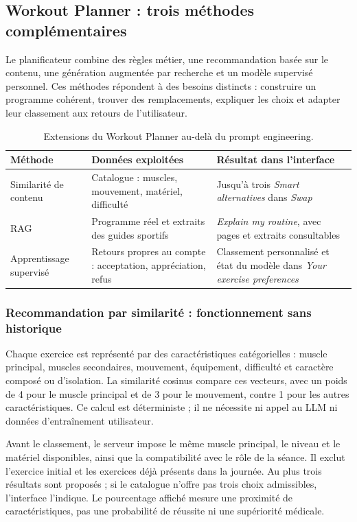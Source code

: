\documentclass[11pt,a4paper]{article}
\begin{document}
\subsection{Workout Planner : trois méthodes complémentaires}
\label{sec:planner-ai}
Le planificateur combine des règles métier, une recommandation basée sur le contenu, une génération augmentée par recherche et un modèle supervisé personnel. Ces méthodes répondent à des besoins distincts : construire un programme cohérent, trouver des remplacements, expliquer les choix et adapter leur classement aux retours de l'utilisateur.
\begin{table}[H]
\small\begin{tabularx}{\linewidth}{p{3cm}XX}
\toprule
\textbf{Méthode} & \textbf{Données exploitées} & \textbf{Résultat dans l'interface} \\
\midrule
Similarité de contenu & Catalogue : muscles, mouvement, matériel, difficulté & Jusqu'à trois \textit{Smart alternatives} dans \textit{Swap} \\
RAG & Programme réel et extraits des guides sportifs & \textit{Explain my routine}, avec pages et extraits consultables \\
Apprentissage supervisé & Retours propres au compte : acceptation, appréciation, refus & Classement personnalisé et état du modèle dans \textit{Your exercise preferences} \\
\bottomrule
\end{tabularx}
\caption{Extensions du Workout Planner au-delà du prompt engineering.}
\end{table}

\subsubsection{Recommandation par similarité : fonctionnement sans historique}
Chaque exercice est représenté par des caractéristiques catégorielles : muscle principal, muscles secondaires, mouvement, équipement, difficulté et caractère composé ou d'isolation. La similarité cosinus compare ces vecteurs, avec un poids de 4 pour le muscle principal et de 3 pour le mouvement, contre 1 pour les autres caractéristiques. Ce calcul est déterministe ; il ne nécessite ni appel au LLM ni données d'entraînement utilisateur.

Avant le classement, le serveur impose le même muscle principal, le niveau et le matériel disponibles, ainsi que la compatibilité avec le rôle de la séance. Il exclut l'exercice initial et les exercices déjà présents dans la journée. Au plus trois résultats sont proposés ; si le catalogue n'offre pas trois choix admissibles, l'interface l'indique. Le pourcentage affiché mesure une proximité de caractéristiques, pas une probabilité de réussite ni une supériorité médicale.
\end{document}
